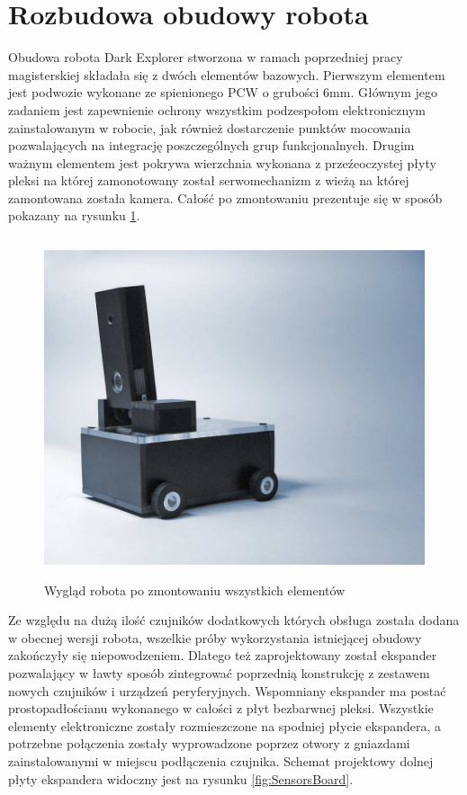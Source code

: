 \section{Rozbudowa obudowy robota}
Obudowa robota Dark Explorer stworzona w ramach poprzedniej pracy magisterskiej
\cite{KmakMScThesis2009} składała się z dwóch elementów bazowych. Pierwszym
elementem jest podwozie wykonane ze spienionego PCW o grubości 6mm. Głównym jego
zadaniem jest zapewnienie ochrony wszystkim podzespołom elektronicznym
zainstalowanym w robocie, jak również dostarczenie punktów mocowania
pozwalających na integrację poszczególnych grup funkcjonalnych. Drugim ważnym
elementem jest pokrywa wierzchnia wykonana z przeźeoczystej płyty pleksi na
której zamonotowany został serwomechanizm z wieżą na której zamontowana została
kamera. Całość po zmontowaniu prezentuje się w sposób pokazany na rysunku
\ref{fig:DESideView}.

\begin{figure}[h!]
 \centering
 \includegraphics[height=100mm]{../images/ch04/de_side_view.png}
 \caption{Wygląd robota po zmontowaniu wszystkich elementów}
 \label{fig:DESideView}
\end{figure}

Ze względu na dużą ilość czujników dodatkowych których obsługa została dodana w
obecnej wersji robota, wszelkie próby wykorzystania istniejącej obudowy
zakończyły się niepowodzeniem. Dlatego też zaprojektowany został ekspander
pozwalający w ławty sposób zintegrować poprzednią konstrukcję z zestawem nowych
czujników i urządzeń peryferyjnych. Wspomniany ekspander ma postać
prostopadłościanu wykonanego w całości z płyt bezbarwnej pleksi. 
Wszystkie elementy elektroniczne zostały rozmieszczone na spodniej płycie
ekspandera, a potrzebne połączenia zostały wyprowadzone poprzez otwory z
gniazdami zainstalowanymi w miejscu podłączenia czujnika. Schemat projektowy
dolnej płyty ekspandera widoczny jest na rysunku \ref{fig:SensorsBoard}.

